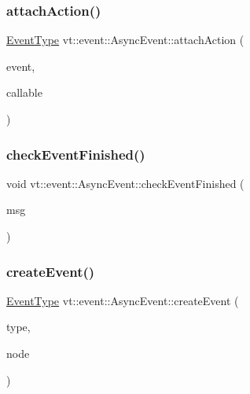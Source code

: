 \subsubsection{\texorpdfstring{attach\+Action()}{attachAction()}}
{\footnotesize\ttfamily \hyperlink{namespacevt_a009267401def7ae8bf201892222d060f}{Event\+Type} vt\+::event\+::\+Async\+Event\+::attach\+Action (\begin{DoxyParamCaption}\item[{\hyperlink{namespacevt_a009267401def7ae8bf201892222d060f}{Event\+Type} const \&}]{event,  }\item[{\hyperlink{namespacevt_ae0a5a7b18cc99d7b732cb4d44f46b0f3}{Action\+Type}}]{callable }\end{DoxyParamCaption})}

\mbox{\label{structvt_1_1event_1_1_async_event_a5493f4402db0fffba5300246247523b9}} 
\subsubsection{\texorpdfstring{check\+Event\+Finished()}{checkEventFinished()}}
{\footnotesize\ttfamily void vt\+::event\+::\+Async\+Event\+::check\+Event\+Finished (\begin{DoxyParamCaption}\item[{\hyperlink{structvt_1_1_event_check_finished_msg}{Event\+Check\+Finished\+Msg} $\ast$}]{msg }\end{DoxyParamCaption})\hspace{0.3cm}{\ttfamily [static]}}

\mbox{\label{structvt_1_1event_1_1_async_event_abc1629d13f9f3391e5e7f9ebc6303265}} 
\subsubsection{\texorpdfstring{create\+Event()}{createEvent()}}
{\footnotesize\ttfamily \hyperlink{namespacevt_a009267401def7ae8bf201892222d060f}{Event\+Type} vt\+::event\+::\+Async\+Event\+::create\+Event (\begin{DoxyParamCaption}\item[{\hyperlink{namespacevt_1_1event_a1ea9fec44d101bf40b8fd786d44ebed9}{Event\+Record\+Type\+Type} const \&}]{type,  }\item[{\hyperlink{namespacevt_a866da9d0efc19c0a1ce79e9e492f47e2}{Node\+Type} const \&}]{node }\end{DoxyParamCaption})}



